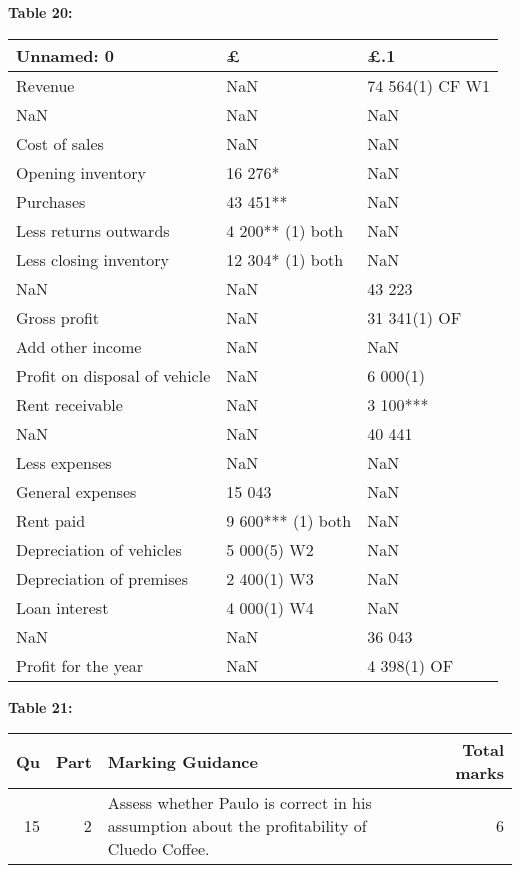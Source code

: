 \documentclass{article}
\begin{document}
\textbf{Table 20:}
\begin{tabular}{lll}
\toprule
Unnamed: 0 & £ & £.1 \\
\midrule
Revenue & NaN & 74 564(1) CF W1 \\
NaN & NaN & NaN \\
Cost of sales & NaN & NaN \\
Opening inventory & 16 276* & NaN \\
Purchases & 43 451** & NaN \\
Less returns outwards & 4 200** (1) both & NaN \\
Less closing inventory & 12 304* (1) both & NaN \\
NaN & NaN & 43 223 \\
Gross profit & NaN & 31 341(1) OF \\
Add other income & NaN & NaN \\
Profit on disposal of vehicle & NaN & 6 000(1) \\
Rent receivable & NaN & 3 100*** \\
NaN & NaN & 40 441 \\
Less expenses & NaN & NaN \\
General expenses & 15 043 & NaN \\
Rent paid & 9 600*** (1) both & NaN \\
Depreciation of vehicles & 5 000(5) W2 & NaN \\
Depreciation of premises & 2 400(1) W3 & NaN \\
Loan interest & 4 000(1) W4 & NaN \\
NaN & NaN & 36 043 \\
Profit for the year & NaN & 4 398(1) OF \\
\bottomrule
\end{tabular}

\textbf{Table 21:}
\begin{tabular}{rrlr}
\toprule
Qu & Part & Marking Guidance & Total
marks \\
\midrule
15 & 2 & Assess whether Paulo is correct in his assumption about the profitability of
Cluedo Coffee. & 6 \\
\bottomrule
\end{tabular}
\end{document}
